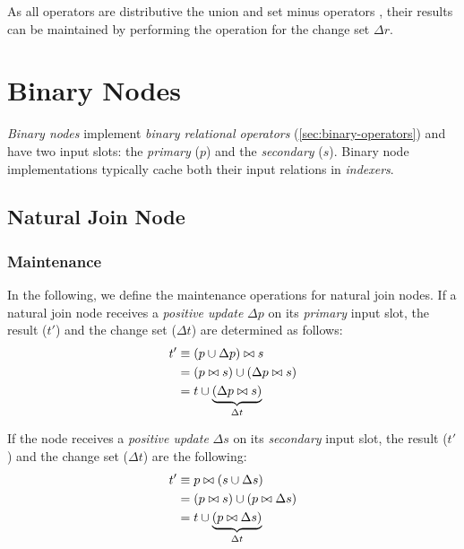 As all operators are distributive \wrt the union and set minus operators , their results can be maintained by performing the operation for the change set $\Delta r$.

\section{Binary Nodes}
\label{sec:binary-nodes}


\emph{Binary nodes} implement \emph{binary relational operators} (\autoref{sec:binary-operators}) and
have two input slots: the \emph{primary} ($p$) and the \emph{secondary} ($s$). Binary node implementations typically cache both their input relations in \emph{indexers}.

\subsection{Natural Join Node}

\subsubsection{Maintenance}

In the following, we define the maintenance operations for natural join nodes. If a natural join node receives a \emph{positive update} $\Delta p$ on its \emph{primary} input slot, the result ($t'$) and the change set ($ \Delta t$) are determined as follows:
\begin{align*}
	t'       & \equiv \left(p \cup \Delta p\right) \bowtie s           \\
	         & = (p \bowtie s) \cup (\Delta p \bowtie s) \\
	         & = t \cup \underbrace{(\Delta p \bowtie s)}_{\Delta t}
\end{align*}

If the node receives a \emph{positive update} $\Delta s$ on its \emph{secondary} input slot, the result ($t'$) and the change set ($ \Delta t$) are the following:
\begin{align*}
	t'       & \equiv p \bowtie \left(s \cup \Delta s\right)           \\
	         & = (p \bowtie s) \cup (p \bowtie \Delta s) \\
	         & = t \cup \underbrace{(p \bowtie \Delta s)}_{\Delta t}
\end{align*}

